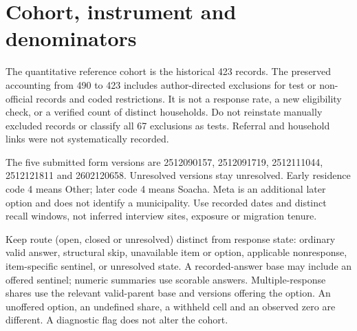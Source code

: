 \section{Cohort, instrument and denominators}
The quantitative reference cohort is the historical 423 records. The preserved accounting from 490 to 423 includes author-directed exclusions for test or non-official records and coded restrictions. It is not a response rate, a new eligibility check, or a verified count of distinct households. Do not reinstate manually excluded records or classify all 67 exclusions as tests. Referral and household links were not systematically recorded.

The five submitted form versions are 2512090157, 2512091719, 2512111044, 2512121811 and 2602120658. Unresolved versions stay unresolved. Early residence code 4 means Other; later code 4 means Soacha. Meta is an additional later option and does not identify a municipality. Use recorded dates and distinct recall windows, not inferred interview sites, exposure or migration tenure.

Keep route (open, closed or unresolved) distinct from response state: ordinary valid answer, structural skip, unavailable item or option, applicable nonresponse, item-specific sentinel, or unresolved state. A recorded-answer base may include an offered sentinel; numeric summaries use scorable answers. Multiple-response shares use the relevant valid-parent base and versions offering the option. An unoffered option, an undefined share, a withheld cell and an observed zero are different. A diagnostic flag does not alter the cohort.

